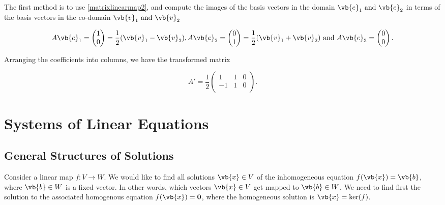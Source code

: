 \documentclass[a4paper,12pt]{report}
\begin{document}
{The first method is to use \cref{matrixlinearmap2}, and compute the images of the basis vectors in the domain \(\vb{e} _{1} \text { and } \vb{e} _{2} \) in terms of the basis vectors in the co-domain \(\vb{v} _{1} \text { and } \vb{v} _{2} \)

\begin{equation}
    A \vb{e} _{1} = \begin{pmatrix}
         1 \\
         0 \\
    \end{pmatrix} = \frac{1}{2}(\vb{v} _{1} - \vb{v} _{2}  ),  A\vb{e} _{2} = \begin{pmatrix}
         0 \\
         1 \\
    \end{pmatrix} = \frac{1}{2} (\vb{v} _{1}+ \vb{v} _{2}  ) \text { and } A\vb{e} _{3} = \begin{pmatrix}
         0 \\
         0 \\
    \end{pmatrix}.
\end{equation}

Arranging the coefficients into columns, we have the transformed matrix 

\begin{equation}
    A' = \frac{1}{2} \begin{pmatrix}
        1 &  1 & 0 \\
        -1 &  1 & 0 \\
    \end{pmatrix}.
\end{equation}
} 


\section{Systems of Linear Equations}

\subsection{General Structures of Solutions}

Consider a linear map \(f:V \to W\). We would like to find all solutions \(\vb{x} \in V\) of the inhomogeneous equation \(f(\vb{x} ) = \vb{b} \), where \(\vb{b} \in W\) is a fixed vector. In other words, which vectors \(\vb{x}  \in V\) get mapped to \(\vb{b} \in W\). We need to find first the solution to the associated homogenous equation \(f(\vb{x} ) = \boldsymbol{0} \), where the homogeneous solution is \(\vb{x} = \ker (f)\).     
\end{document}
